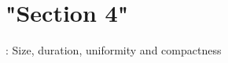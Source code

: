 \chapter{"{}\+Section 4"{}}
\hypertarget{SECTION_4}{}\label{SECTION_4}
\+: Size, duration, uniformity and compactness 